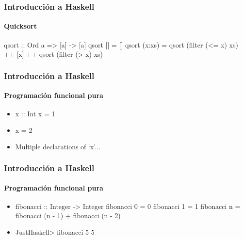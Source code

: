 \documentclass{beamer}
\begin{document}

\begin{frame}[fragile]
  \frametitle{Introducción a Haskell}
  \framesubtitle{Quicksort}

  \scriptsize
  \begin{code}
qsort :: Ord a => [a] -> [a]
qsort []     = []
qsort (x:xs) =
  qsort (filter (<= x) xs) ++ [x] ++ qsort (filter (> x) xs)
  \end{code}
  \normalsize
\end{frame}


\begin{frame}[fragile]
  \frametitle{Introducción a Haskell}
  \framesubtitle{Programación funcional pura}

  \begin{itemize}
  \item
    \begin{code}
x :: Int
x = 1
    \end{code}
  \item
    \begin{code}
x = 2
    \end{code}
  \item
    \begin{code}
    Multiple declarations of ‘x’...
    \end{code}
  \end{itemize}
\end{frame}


\begin{frame}[fragile]
  \frametitle{Introducción a Haskell}
  \framesubtitle{Programación funcional pura}

  \begin{itemize}
  \item
    \small
    \begin{code}
fibonacci :: Integer -> Integer
fibonacci 0 = 0
fibonacci 1 = 1
fibonacci n = fibonacci (n - 1) + fibonacci (n - 2)
    \end{code}
    \normalsize
  \item
    \begin{code}
JustHaskell> fibonacci 5
5
    \end{code}
  \end{itemize}
\end{frame}
\end{document}
